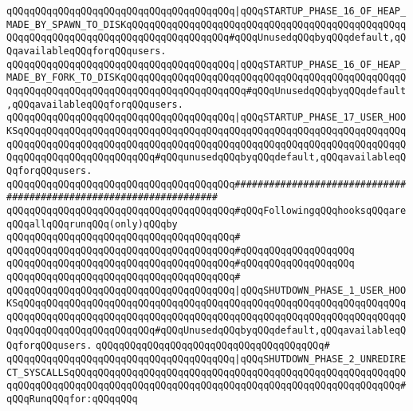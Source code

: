 \verb|qQQqqQQqqQQqqQQqqQQqqQQqqQQqqQQqqQQqqQQq|\verb#|qQQqSTARTUP_PHASE_16_OF_HEAP_MADE_BY_SPAWN_TO_DISKqQQqqQQqqQQqqQQqqQQqqQQqqQQqqQQqqQQqqQQqqQQqqQQqqQQqqQQqqQQqqQQqqQQqqQQqqQQqqQQqqQQqqQQq#\verb|#qQQqUnusedqQQqbyqQQqdefault,qQQqavailableqQQqforqQQqusers.|\newline
\verb|qQQqqQQqqQQqqQQqqQQqqQQqqQQqqQQqqQQqqQQq|\verb#|qQQqSTARTUP_PHASE_16_OF_HEAP_MADE_BY_FORK_TO_DISKqQQqqQQqqQQqqQQqqQQqqQQqqQQqqQQqqQQqqQQqqQQqqQQqqQQqqQQqqQQqqQQqqQQqqQQqqQQqqQQqqQQqqQQqqQQq#\verb|#qQQqUnusedqQQqbyqQQqdefault,qQQqavailableqQQqforqQQqusers.|\newline
\verb|qQQqqQQqqQQqqQQqqQQqqQQqqQQqqQQqqQQqqQQq|\verb#|qQQqSTARTUP_PHASE_17_USER_HOOKSqQQqqQQqqQQqqQQqqQQqqQQqqQQqqQQqqQQqqQQqqQQqqQQqqQQqqQQqqQQqqQQqqQQqqQQqqQQqqQQqqQQqqQQqqQQqqQQqqQQqqQQqqQQqqQQqqQQqqQQqqQQqqQQqqQQqqQQqqQQqqQQqqQQqqQQqqQQqqQQqqQQq#\verb|#qQQqunusedqQQqbyqQQqdefault,qQQqavailableqQQqforqQQqusers.|\newline
\newline
\newline
\verb|qQQqqQQqqQQqqQQqqQQqqQQqqQQqqQQqqQQqqQQq###################################################################|\newline
\verb|qQQqqQQqqQQqqQQqqQQqqQQqqQQqqQQqqQQqqQQq#qQQqFollowingqQQqhooksqQQqareqQQqallqQQqrunqQQq(only)qQQqby|\newline
\verb|qQQqqQQqqQQqqQQqqQQqqQQqqQQqqQQqqQQqqQQq#|\newline
\verb|qQQqqQQqqQQqqQQqqQQqqQQqqQQqqQQqqQQqqQQq#qQQqqQQqqQQqqQQqqQQq|\newline
\verb|qQQqqQQqqQQqqQQqqQQqqQQqqQQqqQQqqQQqqQQq#qQQqqQQqqQQqqQQqqQQq|\newline
\verb|qQQqqQQqqQQqqQQqqQQqqQQqqQQqqQQqqQQqqQQq#|\newline
\verb|qQQqqQQqqQQqqQQqqQQqqQQqqQQqqQQqqQQqqQQq|\verb#|qQQqSHUTDOWN_PHASE_1_USER_HOOKSqQQqqQQqqQQqqQQqqQQqqQQqqQQqqQQqqQQqqQQqqQQqqQQqqQQqqQQqqQQqqQQqqQQqqQQqqQQqqQQqqQQqqQQqqQQqqQQqqQQqqQQqqQQqqQQqqQQqqQQqqQQqqQQqqQQqqQQqqQQqqQQqqQQqqQQqqQQqqQQqqQQq#\verb|#qQQqUnusedqQQqbyqQQqdefault,qQQqavailableqQQqforqQQqusers.|\newline
\verb|qQQqqQQqqQQqqQQqqQQqqQQqqQQqqQQqqQQqqQQq#|\newline
\verb|qQQqqQQqqQQqqQQqqQQqqQQqqQQqqQQqqQQqqQQq|\verb#|qQQqSHUTDOWN_PHASE_2_UNREDIRECT_SYSCALLSqQQqqQQqqQQqqQQqqQQqqQQqqQQqqQQqqQQqqQQqqQQqqQQqqQQqqQQqqQQqqQQqqQQqqQQqqQQqqQQqqQQqqQQqqQQqqQQqqQQqqQQqqQQqqQQqqQQqqQQqqQQqqQQq#\verb|#qQQqRunqQQqfor:qQQqqQQq|\newline
